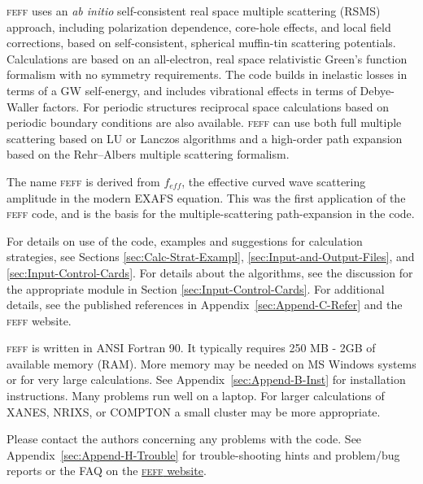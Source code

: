 \documentclass[11pt,oneside]{report} %
\renewcommand{\htmladdnormallink}[2]{\href{#2}{#1}}
\newcommand{\program}[1]{\textsc{#1}}
\newcommand{\feff}{\program{feff}}
\begin{document}
\begin{latexonly}
{\feff} uses an \textit{ab initio} self-consistent real space multiple 
scattering (RSMS) approach, including 
polarization dependence, core\--hole effects, and local field 
corrections, based on self-consistent, spherical muffin-tin scattering
potentials.  Calculations are based on an all-electron, real space 
relativistic Green's function formalism with no symmetry requirements.
The code builds in inelastic losses in terms of a GW self-energy,
and includes vibrational effects in terms of Debye-Waller
factors.  For periodic structures reciprocal space calculations based on
periodic boundary conditions are also available.
{\feff} can use both full multiple scattering based on LU or Lanczos 
algorithms and a high-order path expansion based on the Rehr--Albers 
multiple scattering formalism.

The name {\feff} is derived from $f_{eff}$, the effective curved wave
scattering amplitude in the modern EXAFS equation.  This was the first
application of the {\feff} code, and is the basis for the 
multiple-scattering path-expansion in the code.

For details on use of the code, examples
and suggestions for calculation strategies, see Sections
\ref{sec:Calc-Strat-Exampl}, \ref{sec:Input-and-Output-Files}, and \ref{sec:Input-Control-Cards}. For details about the algorithms,
see the discussion for the appropriate module in Section
\ref{sec:Input-Control-Cards}.  For additional details, see the published
references in Appendix~\ref{sec:Append-C-Refer} and the {\feff} website.

{\feff} is written in ANSI Fortran 90. It typically requires 250 MB - 2GB of available memory (RAM). More memory may be needed on MS Windows systems or for very large calculations.  See Appendix~\ref{sec:Append-B-Inst} for installation instructions.  Many problems run well on a laptop.  For larger calculations of XANES, NRIXS, or COMPTON a small cluster may be more appropriate.  

Please contact the authors concerning any problems with the code. See
Appendix~\ref{sec:Append-H-Trouble} for trouble-shooting hints and
problem/bug reports or the FAQ on the \htmladdnormallink{{\feff} website}{http://feff.phys.washington.edu/feffproject-feff.html}.





\end{latexonly}
\end{document}
